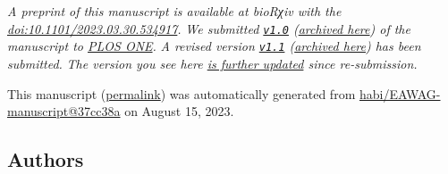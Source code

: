 \emph{A preprint of this manuscript is available at bioRχiv with the \href{https://doi.org/10.1101/2023.03.30.534917}{doi:10.1101/2023.03.30.534917}.}
\emph{We submitted \href{https://github.com/habi/EAWAG-manuscript/releases/tag/v1.0}{\texttt{v1.0}} (\href{https://habi.github.io/EAWAG-manuscript/v/e1e2ef76a476174a4115937d77457037ddec95df/}{archived here}) of the manuscript to \href{https://journals.plos.org/plosone/}{PLOS ONE}.}
\emph{A revised version \href{https://github.com/habi/EAWAG-manuscript/releases/tag/v1.1}{\texttt{v1.1}} (\href{https://habi.github.io/EAWAG-manuscript/v/c49d0b8ac8f078c226318972b06e8c4a39100bb2/}{archived here}) has been submitted.}
\emph{The version you see here \href{https://github.com/habi/EAWAG-manuscript/compare/v1.1...37cc38a386f502ad80dd15509062ce55dc9330d8\#files_bucket}{is further updated} since re-submission.}

This manuscript
(\href{https://habi.github.io/EAWAG-manuscript/v/37cc38a386f502ad80dd15509062ce55dc9330d8/}{permalink})
was automatically generated
from \href{https://github.com/habi/EAWAG-manuscript/tree/37cc38a386f502ad80dd15509062ce55dc9330d8}{habi/EAWAG-manuscript@37cc38a}
on August 15, 2023.

\hypertarget{authors}{%
\subsection{Authors}\label{authors}}

